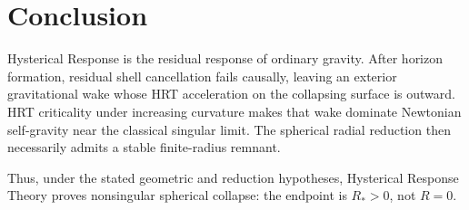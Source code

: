 \documentclass[11pt]{article}
\theoremstyle{definition}
\theoremstyle{remark}
\begin{document}
\section{Conclusion}
\label{sec:conclusion}
Hysterical Response is the residual response of ordinary gravity.
After horizon formation, residual shell cancellation fails causally, leaving an exterior
gravitational wake whose HRT acceleration on the collapsing surface is outward.
HRT criticality under increasing curvature makes that wake dominate Newtonian
self-gravity near the classical singular limit.
The spherical radial reduction then necessarily admits a stable finite-radius remnant.

Thus, under the stated geometric and reduction hypotheses, Hysterical Response Theory
proves nonsingular spherical collapse: the endpoint is $R_\ast>0$, not $R=0$.



\end{document}

